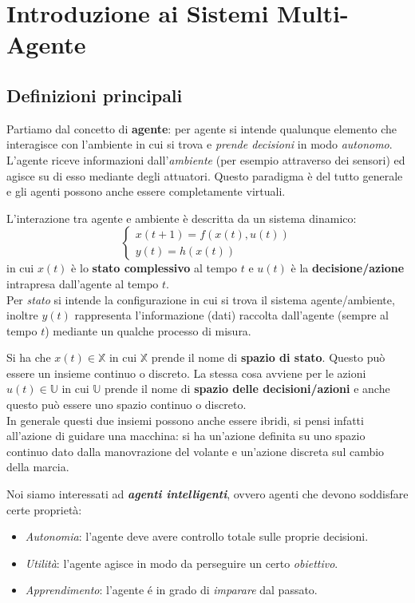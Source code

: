 \section{Introduzione ai Sistemi Multi-Agente}
\subsection{Definizioni principali}
Partiamo dal concetto di \textbf{agente}: per agente si intende qualunque elemento che interagisce con l'ambiente in cui si trova e \textit{prende decisioni} in modo \textit{autonomo}.\\
L'agente riceve informazioni dall'\textit{ambiente} (per esempio attraverso dei sensori) ed agisce su di esso mediante degli attuatori. Questo paradigma \`e del tutto generale e gli agenti possono anche essere completamente virtuali.

L'interazione tra agente e ambiente \`e descritta da un sistema dinamico:
\begin{equation}
\begin{cases}
x(t+1) = f(x(t), u(t)) \\
y(t) = h(x(t))
\end{cases}
\end{equation}
in cui $x(t)$ \`e lo \textbf{stato complessivo} al tempo $t$ e $u(t)$ \`e la \textbf{decisione/azione} intrapresa dall'agente al tempo $t$. \\
Per \textit{stato} si intende la configurazione in cui si trova il sistema agente/ambiente, inoltre $y(t)$ rappresenta l'informazione (dati) raccolta dall'agente (sempre al tempo $t$) mediante un qualche processo di misura.

Si ha che $x(t) \in \mathbb{X}$ in cui $\mathbb{X}$ prende il nome di \textbf{spazio di stato}. Questo pu\`o essere un insieme continuo o discreto. La stessa cosa avviene per le azioni $u(t) \in \mathbb{U}$ in cui $\mathbb{U}$ prende il nome di \textbf{spazio delle decisioni/azioni} e anche questo pu\`o essere uno spazio continuo o discreto. \\
In generale questi due insiemi possono anche essere ibridi, si pensi infatti all'azione di guidare una macchina: si ha un'azione definita su uno spazio continuo dato dalla manovrazione del volante e un'azione discreta sul cambio della marcia.

Noi siamo interessati ad \textbf{\textit{agenti intelligenti}}, ovvero agenti che devono soddisfare certe propriet\`a:
\begin{itemize}
\item \textit{Autonomia}: l'agente deve avere controllo totale sulle proprie decisioni.
\item \textit{Utilit\`a}: l'agente agisce in modo da perseguire un certo \textit{obiettivo}.
\item \textit{Apprendimento}: l'agente \'e in grado di \textit{imparare} dal passato.
\end{itemize}

